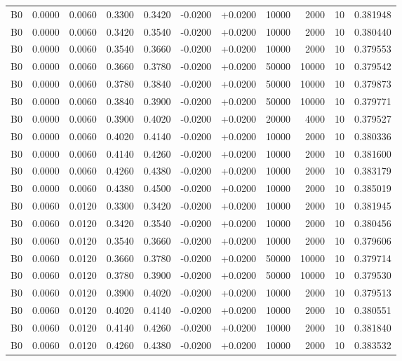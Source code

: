 \documentclass{article}
\begin{document}
\begin{longtable}{l r r r r r r r r r l}
B0 & 0.0000 & 0.0060 & 0.3300 & 0.3420 & -0.0200 & +0.0200 & 10000 & 2000 & 10 & 0.381948 \\
B0 & 0.0000 & 0.0060 & 0.3420 & 0.3540 & -0.0200 & +0.0200 & 10000 & 2000 & 10 & 0.380440 \\
B0 & 0.0000 & 0.0060 & 0.3540 & 0.3660 & -0.0200 & +0.0200 & 10000 & 2000 & 10 & 0.379553 \\
B0 & 0.0000 & 0.0060 & 0.3660 & 0.3780 & -0.0200 & +0.0200 & 50000 & 10000 & 10 & 0.379542 \\
B0 & 0.0000 & 0.0060 & 0.3780 & 0.3840 & -0.0200 & +0.0200 & 50000 & 10000 & 10 & 0.379873 \\
B0 & 0.0000 & 0.0060 & 0.3840 & 0.3900 & -0.0200 & +0.0200 & 50000 & 10000 & 10 & 0.379771 \\
B0 & 0.0000 & 0.0060 & 0.3900 & 0.4020 & -0.0200 & +0.0200 & 20000 & 4000 & 10 & 0.379527 \\
B0 & 0.0000 & 0.0060 & 0.4020 & 0.4140 & -0.0200 & +0.0200 & 10000 & 2000 & 10 & 0.380336 \\
B0 & 0.0000 & 0.0060 & 0.4140 & 0.4260 & -0.0200 & +0.0200 & 10000 & 2000 & 10 & 0.381600 \\
B0 & 0.0000 & 0.0060 & 0.4260 & 0.4380 & -0.0200 & +0.0200 & 10000 & 2000 & 10 & 0.383179 \\
B0 & 0.0000 & 0.0060 & 0.4380 & 0.4500 & -0.0200 & +0.0200 & 10000 & 2000 & 10 & 0.385019 \\
B0 & 0.0060 & 0.0120 & 0.3300 & 0.3420 & -0.0200 & +0.0200 & 10000 & 2000 & 10 & 0.381945 \\
B0 & 0.0060 & 0.0120 & 0.3420 & 0.3540 & -0.0200 & +0.0200 & 10000 & 2000 & 10 & 0.380456 \\
B0 & 0.0060 & 0.0120 & 0.3540 & 0.3660 & -0.0200 & +0.0200 & 10000 & 2000 & 10 & 0.379606 \\
B0 & 0.0060 & 0.0120 & 0.3660 & 0.3780 & -0.0200 & +0.0200 & 50000 & 10000 & 10 & 0.379714 \\
B0 & 0.0060 & 0.0120 & 0.3780 & 0.3900 & -0.0200 & +0.0200 & 50000 & 10000 & 10 & 0.379530 \\
B0 & 0.0060 & 0.0120 & 0.3900 & 0.4020 & -0.0200 & +0.0200 & 10000 & 2000 & 10 & 0.379513 \\
B0 & 0.0060 & 0.0120 & 0.4020 & 0.4140 & -0.0200 & +0.0200 & 10000 & 2000 & 10 & 0.380551 \\
B0 & 0.0060 & 0.0120 & 0.4140 & 0.4260 & -0.0200 & +0.0200 & 10000 & 2000 & 10 & 0.381840 \\
B0 & 0.0060 & 0.0120 & 0.4260 & 0.4380 & -0.0200 & +0.0200 & 10000 & 2000 & 10 & 0.383532 \\

\end{longtable}
\end{document}
